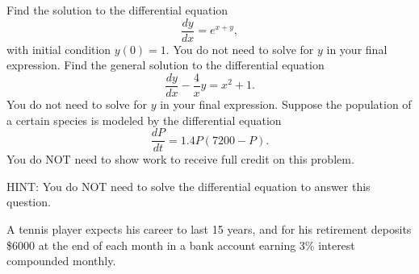 \begin{questions}
\question[10] Find the solution to the differential equation
$$\dfrac{dy}{dx} = e^{x+y},$$
\noindent with initial condition $y(0) = 1.$ You do not need to solve for $y$ in your final
expression.
\newpage
\question[10] Find the general solution to the differential equation
$$ \dfrac{dy}{dx} - \dfrac{4}{x}y = x^2+1.$$ You do not need to solve for $y$ in your final
expression.
\newpage
\question Suppose the population of a certain species is modeled by the differential equation
$$\dfrac{dP}{dt} = 1.4P(7200-P). $$
You do NOT need to show work to receive full credit on this problem.

HINT: You do NOT need to solve the differential equation to answer this question.
\bigskip
{}
\newpage
\question A tennis player expects his career to last 15 years, and for his retirement deposits
\$6000 at the end of each month in a bank account earning 3\% interest compounded monthly.
\end{questions}

